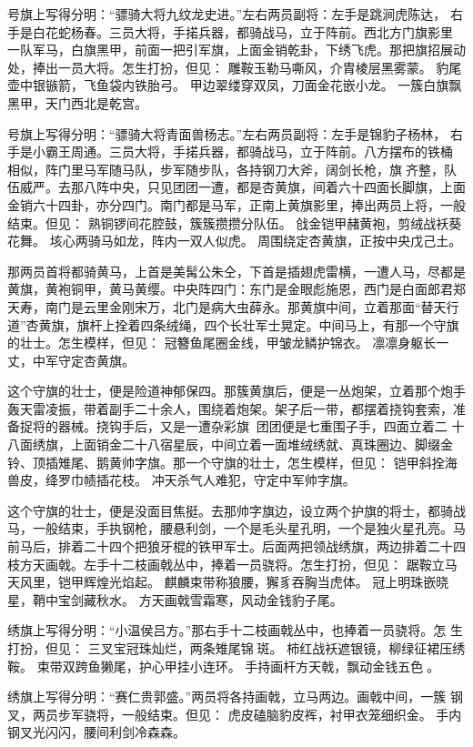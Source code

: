 号旗上写得分明：“骠骑大将九纹龙史进。”左右两员副将：左手是跳涧虎陈达，
右手是白花蛇杨春。三员大将，手掿兵器，都骑战马，立于阵前。西北方门旗影里
一队军马，白旗黑甲，前面一把引军旗，上面金销乾卦，下绣飞虎。那把旗招展动
处，捧出一员大将。怎生打扮，但见：
雕鞍玉勒马嘶风，介胄棱层黑雾蒙。
豹尾壶中银镞箭，飞鱼袋内铁胎弓。
甲边翠缕穿双凤，刀面金花嵌小龙。
一簇白旗飘黑甲，天门西北是乾宫。

号旗上写得分明：“骠骑大将青面兽杨志。”左右两员副将：左手是锦豹子杨林，
右手是小霸王周通。三员大将，手掿兵器，都骑战马，立于阵前。八方摆布的铁桶
相似，阵门里马军随马队，步军随步队，各持钢刀大斧，阔剑长枪，旗齐整，队
伍威严。去那八阵中央，只见团团一遭，都是杏黄旗，间着六十四面长脚旗，上面
金销六十四卦，亦分四门。南门都是马军，正南上黄旗影里，捧出两员上将，一般
结束。但见：
熟铜锣间花腔鼓，簇簇攒攒分队伍。
戗金铠甲赭黄袍，剪绒战袄葵花舞。
垓心两骑马如龙，阵内一双人似虎。
周围绕定杏黄旗，正按中央戊己土。

那两员首将都骑黄马，上首是美髯公朱仝，下首是插翅虎雷横，一遭人马，尽都是
黄旗，黄袍铜甲，黄马黄缨。中央阵四门：东门是金眼彪施恩，西门是白面郎君郑
天寿，南门是云里金刚宋万，北门是病大虫薛永。那黄旗中间，立着那面“替天行
道”杏黄旗，旗杆上拴着四条绒绳，四个长壮军士晃定。中间马上，有那一个守旗
的壮士。怎生模样，但见：
冠簪鱼尾圈金线，甲皱龙鳞护锦衣。
凛凛身躯长一丈，中军守定杏黄旗。

这个守旗的壮士，便是险道神郁保四。那簇黄旗后，便是一丛炮架，立着那个炮手
轰天雷凌振，带着副手二十余人，围绕着炮架。架子后一带，都摆着挠钩套索，准
备捉将的器械。挠钩手后，又是一遭杂彩旗，团团便是七重围子手，四面立着二
十八面绣旗，上面销金二十八宿星辰，中间立着一面堆绒绣就、真珠圈边、脚缀金
铃、顶插雉尾、鹅黄帅字旗。那一个守旗的壮士，怎生模样，但见：
铠甲斜拴海兽皮，绛罗巾帻插花枝。
冲天杀气人难犯，守定中军帅字旗。

这个守旗的壮士，便是没面目焦挺。去那帅字旗边，设立两个护旗的将士，都骑战
马，一般结束，手执钢枪，腰悬利剑，一个是毛头星孔明，一个是独火星孔亮。马
前马后，排着二十四个把狼牙棍的铁甲军士。后面两把领战绣旗，两边排着二十四
枝方天画戟。左手十二枝画戟丛中，捧着一员骁将。怎生打扮，但见：
踞鞍立马天风里，铠甲辉煌光焰起。
麒麟束带称狼腰，獬豸吞胸当虎体。
冠上明珠嵌晓星，鞘中宝剑藏秋水。
方天画戟雪霜寒，风动金钱豹子尾。

绣旗上写得分明：“小温侯吕方。”那右手十二枝画戟丛中，也捧着一员骁将。怎
生打扮，但见：
三叉宝冠珠灿烂，两条雉尾锦斑。
柿红战袄遮银镜，柳绿征裙压绣鞍。
束带双跨鱼獭尾，护心甲挂小连环。
手持画杆方天戟，飘动金钱五色。

绣旗上写得分明：“赛仁贵郭盛。”两员将各持画戟，立马两边。画戟中间，一簇
钢叉，两员步军骁将，一般结束。但见：
虎皮磕脑豹皮裈，衬甲衣笼细织金。
手内钢叉光闪闪，腰间利剑冷森森。

